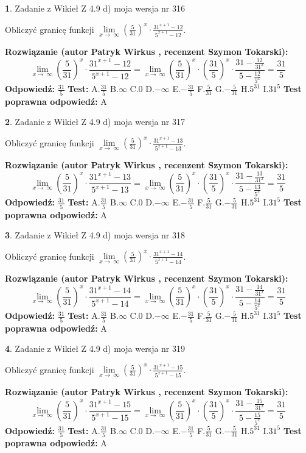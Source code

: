 \documentclass[12pt, a4paper]{article}
\theoremstyle{definition} %
\newtheorem{zad}{}
\newcommand{\zadStart}[1]{\begin{zad}#1\newline}
\newcommand{\zadStop}{\end{zad}}
\newcommand{\rozwStart}[2]{\noindent \textbf{Rozwiązanie (autor #1 , recenzent #2): }\newline}
\newcommand{\rozwStop}{\newline}
\newcommand{\odpStart}{\noindent \textbf{Odpowiedź:}\newline}
\newcommand{\odpStop}{\newline}
\newcommand{\testStart}{\noindent \textbf{Test:}\newline}
\newcommand{\testStop}{\newline}
\newcommand{\kluczStart}{\noindent \textbf{Test poprawna odpowiedź:}\newline}
\newcommand{\kluczStop}{\newline}
\begin{document}
\zadStart{Zadanie z Wikieł Z 4.9 d) moja wersja nr 316}


Obliczyć granicę funkcji  $\lim\limits_{x\to\ \infty}(\frac{5}{31})^{x}\cdot\frac{31^{x+1}-12}{5^{x+1}-12}$.
\zadStop
\rozwStart{Patryk Wirkus}{Szymon Tokarski}
$$\lim\limits_{x\to\ \infty}(\frac{5}{31})^{x}\cdot\frac{31^{x+1}-12}{5^{x+1}-12}=\lim\limits_{x\to\ \infty}(\frac{5}{31})^{x}\cdot(\frac{31}{5})^{x} \cdot \frac{31-\frac{12}{31^{x}}}{5-\frac{12}{5^{x}}} = \frac{31}{5}$$
\rozwStop
\odpStart
$\frac{31}{5}$
\odpStop
\testStart
A.$\frac{31}{5}$ B.$\infty$ C.$0$ D.$-\infty$ E.$-\frac{31}{5}$
F.$\frac{5}{31}$ G.$-\frac{5}{31}$
H.$5^{31}$
I.$31^{5}$
\testStop
\kluczStart
A
\kluczStop



\zadStart{Zadanie z Wikieł Z 4.9 d) moja wersja nr 317}


Obliczyć granicę funkcji  $\lim\limits_{x\to\ \infty}(\frac{5}{31})^{x}\cdot\frac{31^{x+1}-13}{5^{x+1}-13}$.
\zadStop
\rozwStart{Patryk Wirkus}{Szymon Tokarski}
$$\lim\limits_{x\to\ \infty}(\frac{5}{31})^{x}\cdot\frac{31^{x+1}-13}{5^{x+1}-13}=\lim\limits_{x\to\ \infty}(\frac{5}{31})^{x}\cdot(\frac{31}{5})^{x} \cdot \frac{31-\frac{13}{31^{x}}}{5-\frac{13}{5^{x}}} = \frac{31}{5}$$
\rozwStop
\odpStart
$\frac{31}{5}$
\odpStop
\testStart
A.$\frac{31}{5}$ B.$\infty$ C.$0$ D.$-\infty$ E.$-\frac{31}{5}$
F.$\frac{5}{31}$ G.$-\frac{5}{31}$
H.$5^{31}$
I.$31^{5}$
\testStop
\kluczStart
A
\kluczStop



\zadStart{Zadanie z Wikieł Z 4.9 d) moja wersja nr 318}


Obliczyć granicę funkcji  $\lim\limits_{x\to\ \infty}(\frac{5}{31})^{x}\cdot\frac{31^{x+1}-14}{5^{x+1}-14}$.
\zadStop
\rozwStart{Patryk Wirkus}{Szymon Tokarski}
$$\lim\limits_{x\to\ \infty}(\frac{5}{31})^{x}\cdot\frac{31^{x+1}-14}{5^{x+1}-14}=\lim\limits_{x\to\ \infty}(\frac{5}{31})^{x}\cdot(\frac{31}{5})^{x} \cdot \frac{31-\frac{14}{31^{x}}}{5-\frac{14}{5^{x}}} = \frac{31}{5}$$
\rozwStop
\odpStart
$\frac{31}{5}$
\odpStop
\testStart
A.$\frac{31}{5}$ B.$\infty$ C.$0$ D.$-\infty$ E.$-\frac{31}{5}$
F.$\frac{5}{31}$ G.$-\frac{5}{31}$
H.$5^{31}$
I.$31^{5}$
\testStop
\kluczStart
A
\kluczStop



\zadStart{Zadanie z Wikieł Z 4.9 d) moja wersja nr 319}


Obliczyć granicę funkcji  $\lim\limits_{x\to\ \infty}(\frac{5}{31})^{x}\cdot\frac{31^{x+1}-15}{5^{x+1}-15}$.
\zadStop
\rozwStart{Patryk Wirkus}{Szymon Tokarski}
$$\lim\limits_{x\to\ \infty}(\frac{5}{31})^{x}\cdot\frac{31^{x+1}-15}{5^{x+1}-15}=\lim\limits_{x\to\ \infty}(\frac{5}{31})^{x}\cdot(\frac{31}{5})^{x} \cdot \frac{31-\frac{15}{31^{x}}}{5-\frac{15}{5^{x}}} = \frac{31}{5}$$
\rozwStop
\odpStart
$\frac{31}{5}$
\odpStop
\testStart
A.$\frac{31}{5}$ B.$\infty$ C.$0$ D.$-\infty$ E.$-\frac{31}{5}$
F.$\frac{5}{31}$ G.$-\frac{5}{31}$
H.$5^{31}$
I.$31^{5}$
\testStop
\kluczStart
A
\kluczStop
\end{document}
